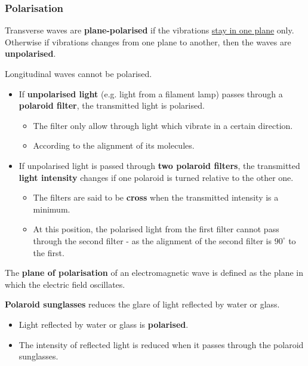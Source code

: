 \subsubsection*{Polarisation}
Transverse waves are \textbf{plane-polarised} if the vibrations \underline{stay in one plane} only. Otherwise if vibrations changes from one plane to another, then the waves are \textbf{unpolarised}.

Longitudinal waves cannot be polarised.
\begin{itemize}
    \item If \textbf{unpolarised light} (e.g. light from a filament lamp) passes through a \textbf{polaroid filter}, the transmitted light is polarised.
        \begin{itemize}
            \item The filter only allow through light which vibrate in a certain direction.
            \item According to the alignment of its molecules.
        \end{itemize}
    \item If unpolarised light is passed through \textbf{two polaroid filters}, the transmitted \textbf{light intensity} changes if one polaroid is turned relative to the other one.
        \begin{itemize}
            \item The filters are said to be \textbf{cross} when the transmitted intensity is a minimum.
            \item At this position, the polarised light from the first filter cannot pass through the second filter - as the alignment of the second filter is $90^\circ$ to the first.
        \end{itemize}
\end{itemize}

The \textbf{plane of polarisation} of an electromagnetic wave is defined as the plane in which the electric field oscillates.

\textbf{Polaroid sunglasses} reduces the glare of light reflected by water or glass.
\begin{itemize}
    \item Light reflected by water or glass is \textbf{polarised}.
    \item The intensity of reflected light is reduced when it passes through the polaroid sunglasses.
\end{itemize}
